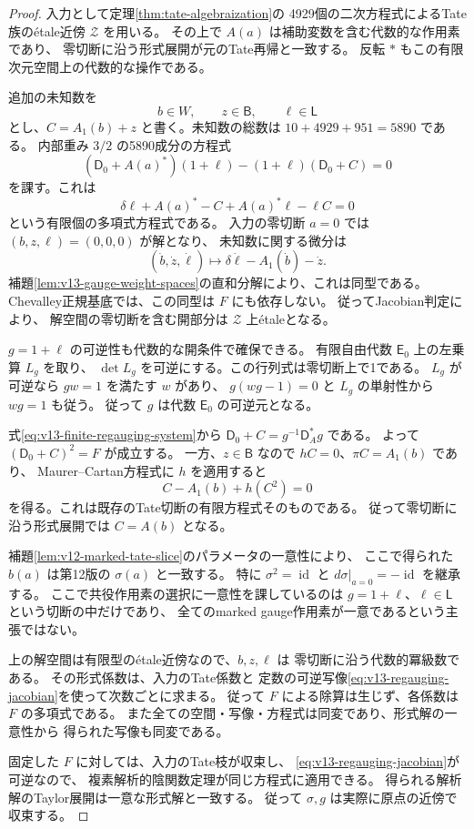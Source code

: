 \documentclass[a4paper,11pt]{ltjsarticle}
\theoremstyle{definition}
\begin{document}
\begin{proof}
入力として定理\ref{thm:tate-algebraization}の
4929個の二次方程式によるTate族の\'etale近傍 $\mathcal Z$ を用いる。
その上で $A(a)$ は補助変数を含む代数的な作用素であり、
零切断に沿う形式展開が元のTate再帰と一致する。
反転 $*$ もこの有限次元空間上の代数的な操作である。

追加の未知数を
\[
 b\in W,\qquad z\in\mathsf B,\qquad \ell\in\mathsf L
\]
とし、$C=A_1(b)+z$ と書く。未知数の総数は
$10+4929+951=5890$ である。
内部重み $3/2$ の5890成分の方程式
\begin{equation}\label{eq:v13-finite-regauging-system}
 (\mathsf D_0+A(a)^*)(1+\ell)
       -(1+\ell)(\mathsf D_0+C)=0
\end{equation}
を課す。これは
\[
 \delta\ell+A(a)^*-C+A(a)^*\ell-\ell C=0
\]
という有限個の多項式方程式である。
入力の零切断 $a=0$ では $(b,z,\ell)=(0,0,0)$ が解となり、
未知数に関する微分は
\begin{equation}\label{eq:v13-regauging-jacobian}
 (\dot b,\dot z,\dot\ell)
   \longmapsto\delta\dot\ell-A_1(\dot b)-\dot z.
\end{equation}
補題\ref{lem:v13-gauge-weight-spaces}の直和分解により、これは同型である。
Chevalley正規基底では、この同型は $F$ にも依存しない。
従ってJacobian判定\cite[Proposition 59.26.2(3)]{StacksEtaleCriterion}により、
解空間の零切断を含む開部分は
$\mathcal Z$ 上\'etaleとなる。

$g=1+\ell$ の可逆性も代数的な開条件で確保できる。
有限自由代数 $\mathsf E_0$ 上の左乗算 $L_g$ を取り、
$\det L_g$ を可逆にする。この行列式は零切断上で1である。
$L_g$ が可逆なら $gw=1$ を満たす $w$ があり、
$g(wg-1)=0$ と $L_g$ の単射性から $wg=1$ も従う。
従って $g$ は代数 $\mathsf E_0$ の可逆元となる。

式\eqref{eq:v13-finite-regauging-system}から
$\mathsf D_0+C=g^{-1}\mathsf D_A^*g$ である。
よって $(\mathsf D_0+C)^2=F$ が成立する。
一方、$z\in\mathsf B$ なので $hC=0$、$\pi C=A_1(b)$ であり、
Maurer--Cartan方程式に $h$ を適用すると
\[
 C-A_1(b)+h(C^2)=0
\]
を得る。これは既存のTate切断の有限方程式そのものである。
従って零切断に沿う形式展開では $C=A(b)$ となる。

補題\ref{lem:v12-marked-tate-slice}のパラメータの一意性により、
ここで得られた $b(a)$ は第12版の $\sigma(a)$ と一致する。
特に $\sigma^2=\operatorname{id}$ と
$d\sigma|_{a=0}=-\operatorname{id}$ を継承する。
ここで共役作用素の選択に一意性を課しているのは
$g=1+\ell$、$\ell\in\mathsf L$ という切断の中だけであり、
全てのmarked gauge作用素が一意であるという主張ではない。

上の解空間は有限型の\'etale近傍なので、$b,z,\ell$ は
零切断に沿う代数的冪級数である。
その形式係数は、入力のTate係数と
定数の可逆写像\eqref{eq:v13-regauging-jacobian}を使って次数ごとに求まる。
従って $F$ による除算は生じず、各係数は $F$ の多項式である。
また全ての空間・写像・方程式は同変であり、形式解の一意性から
得られた写像も同変である。

固定した $F$ に対しては、入力のTate枝が収束し、
\eqref{eq:v13-regauging-jacobian}が可逆なので、
複素解析的陰関数定理が同じ方程式に適用できる。
得られる解析解のTaylor展開は一意な形式解と一致する。
従って $\sigma,g$ は実際に原点の近傍で収束する。
\end{proof}
\end{document}
